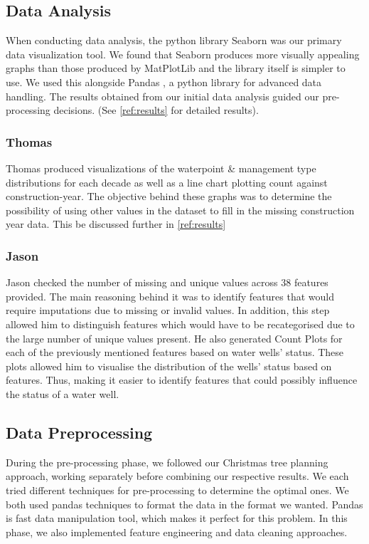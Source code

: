 \documentclass[conference]{IEEEtran}
\begin{document}
\subsection{Data Analysis}

When conducting data analysis, the python library Seaborn \cite{seaborn} was our primary data visualization tool. We found that Seaborn produces more visually appealing graphs than those produced by MatPlotLib and the library itself is simpler to use. We used this alongside Pandas \cite{pandas}, a python library for advanced data handling. The results obtained from our initial data analysis guided our pre-processing decisions. (See \ref{ref:results} for detailed results).

\subsubsection{Thomas}

Thomas produced visualizations of the waterpoint \& management type distributions for each decade as well as a line chart plotting count against construction-year. The objective behind these graphs was to determine the possibility of using other values in the dataset to fill in the missing construction year data. This be discussed further in \ref{ref:results}

\subsubsection{Jason}

Jason checked the number of missing and unique values across 38 features provided. The main reasoning behind it was to identify features that would require imputations due to missing or invalid values. In addition, this step allowed him to distinguish features which would have to be recategorised due to the large number of unique values present.  He also generated Count Plots for each of the previously mentioned features based on water wells' status. These plots allowed him to visualise the distribution of the wells' status based on features. Thus, making it easier to identify features that could possibly influence the status of a water well.

\subsection{Data Preprocessing}

During the pre-processing phase, we followed our Christmas tree planning approach, working separately before combining our respective results. We each tried different techniques for pre-processing to determine the optimal ones. We both used pandas techniques to format the data in the format we wanted. Pandas is fast data manipulation tool, which makes it perfect for this problem. In this phase, we also implemented feature engineering and data cleaning approaches.
\end{document}
